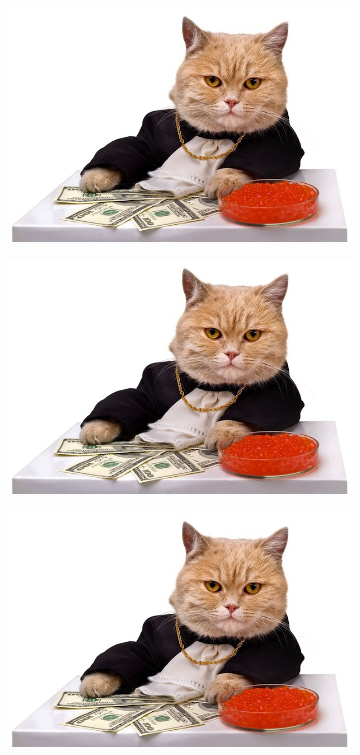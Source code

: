 \documentclass{report} \usepackage[T1]{fontenc} \usepackage[italian]{babel}
\begin{document}
\begin{figure}[H]
\centering
  \begin{subfigure}[b]{0.5\textwidth}
  \includegraphics[width=\textwidth]{cat_caviar}
  \end{subfigure}
  \begin{subfigure}[b]{0.5\textwidth}
  \includegraphics[width=\textwidth]{cat_caviar}
  \end{subfigure}
  \begin{subfigure}[b]{0.5\textwidth}
  \includegraphics[width=\textwidth]{cat_caviar}

\end{subfigure}
\end{figure}
\end{document}
